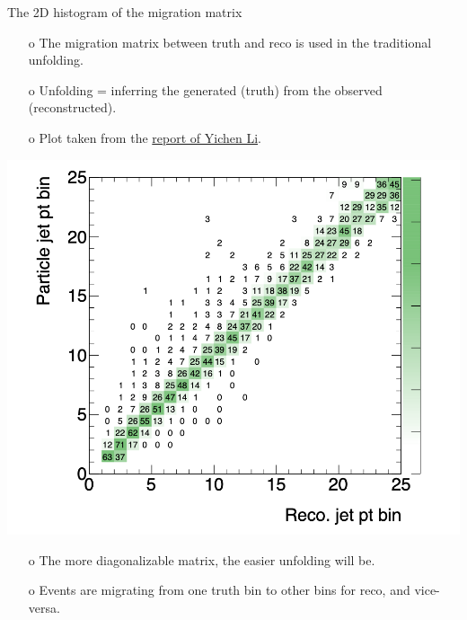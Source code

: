 \begin{frame} {The 2D histogram of the migration matrix}
\begin{enumerate}
\item[o] The migration matrix between truth and reco is used in the traditional unfolding.
\item[o] Unfolding = inferring the generated (truth) from the observed (reconstructed).
\item[o] Plot taken from the \href{http://www.desy.de/~liyichen/Unfolding.pdf}{report of Yichen Li}. 
\end{enumerate}
\centering
\includegraphics[height=0.48\textheight]{./plots/jetPt_migration_matrix.png}
\begin{enumerate}
\item[o] The more diagonalizable matrix, the easier unfolding will be.
\item[o] Events are migrating from one truth bin to other bins for reco, and vice-versa.
\end{enumerate}
\end{frame}
\clearpage


